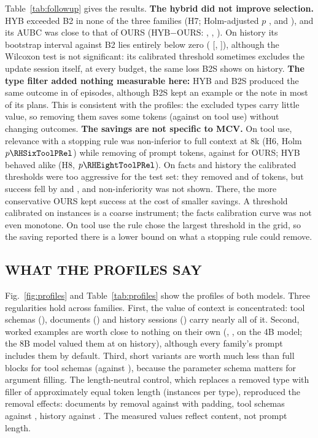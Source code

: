 Table~\ref{tab:followup} gives the results. \textbf{The hybrid did not improve selection.} HYB exceeded B2 in none of the
three families (H7; Holm-adjusted $p$ \RHSevenFactsP, \RHSevenHistoryP and \RHSevenToolP), and its AUBC was close to that of OURS
(HYB$-$OURS: \RHybVsOursFacts, \RHybVsOursHistory, \RHybVsOursTool). On history its bootstrap interval against B2 lies
entirely below zero (\RHSevenHistoryDiff{} [\RHSevenHistoryLo, \RHSevenHistoryHi]), although the Wilcoxon test is not
significant: its calibrated threshold sometimes excludes the update session itself, at every budget, the same loss
B2S shows on history. \textbf{The type filter added nothing measurable here:} HYB and
B2S produced the same outcome in \RHybStopSame of episodes, although B2S kept an example or the note in most of its plans. This
is consistent with the profiles: the excluded types carry little value, so removing them saves some tokens
(\RTokCutHybTool against \RTokCutStopTool on tool use) without changing outcomes. \textbf{The savings are not specific to MCV.} On tool use,
relevance with a stopping rule was non-inferior to full context at 8k (H6, Holm $p\RHSixToolPRel$) while removing
\RTokCutStopTool of prompt tokens, against \RTokCutTool for OURS; HYB behaved alike (H8, $p\RHEightToolPRel$). On facts and
history the calibrated thresholds were too aggressive for the test set: they removed \RTokCutStopFacts and
\RTokCutStopHistory of tokens, but success fell by \RHSixFactsDiff{} and \RHSixHistoryDiff{}, and non-inferiority was not
shown. There, the more conservative OURS kept success at the cost of smaller savings. A threshold calibrated on
\RNCalib instances is a coarse instrument; the facts calibration curve was not even monotone. On tool use the rule chose the
largest threshold in the grid, so the saving reported there is a lower bound on what a stopping rule could remove.

\subsection{WHAT THE PROFILES SAY}
Fig.~\ref{fig:profiles} and Table~\ref{tab:profiles} show the profiles of both models. Three regularities hold across families. First,
the value of context is concentrated: tool schemas (\RMcvToolToolSchema), documents (\RMcvFactsFact) and history
sessions (\RMcvHistoryHistoryTurn) carry nearly all of it. Second, worked examples are worth close to nothing
on their own (\RMcvFactsExample, \RMcvHistoryExample, \RMcvToolExample on the 4B model; the 8B model valued them
at \RMcvEightHistoryExample on history), although every family's prompt includes them by default. Third, short variants are worth much less than full blocks for tool schemas
(\RShortToolToolSchema against \RMcvToolToolSchema), because the parameter schema matters for argument filling.
The length-neutral control, which replaces a removed type with filler of approximately equal token length (\RPadN instances per
type), reproduced the removal effects: documents \RRemFactsFact by removal against \RPadFactsFact with padding, tool
schemas \RRemToolToolSchema against \RPadToolToolSchema, history \RRemHistoryHistoryTurn against
\RPadHistoryHistoryTurn. The measured values reflect content, not prompt length.

